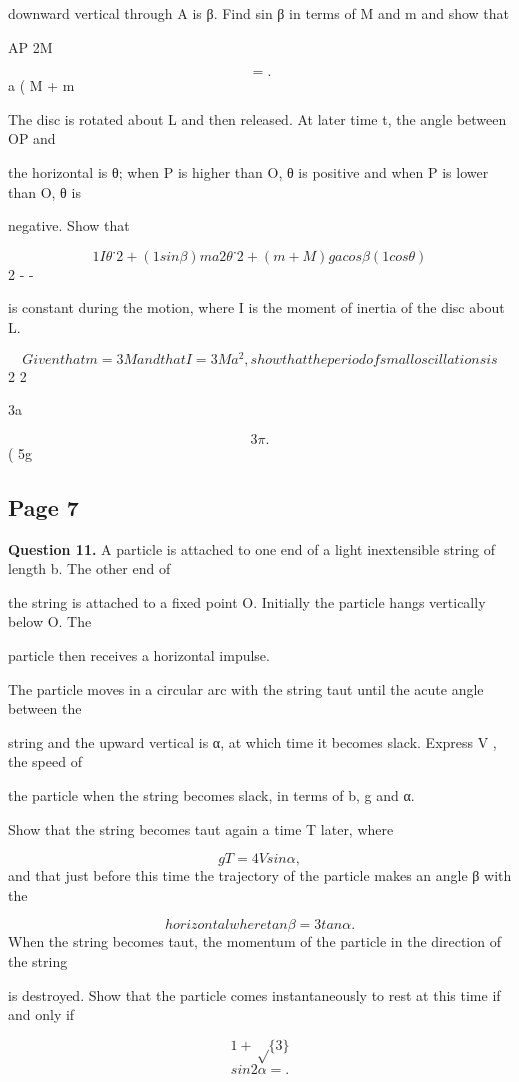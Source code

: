 \documentclass[12pt]{article}
\begin{document}
\begin{flushleft}
downward vertical through A is β. Find sin β in terms of M and m and show that\par
AP 2M\par
\[= .\]
a ( M + m\par
The disc is rotated about L and then released. At later time t, the angle between OP and\par
the horizontal is θ; when P is higher than O, θ is positive and when P is lower than O, θ is\par
negative. Show that\par
\[1 Iθ˙2 + (1 sin β)ma2θ˙2 + (m + M )ga cos β (1 cos θ)\]
2 - -\par
is constant during the motion, where I is the moment of inertia of the disc about L.\par
\[Given that m = 3 M and that I = 3 M a^2, show that the period of small oscillations is\]
2 2\par
3a\par
\[3\pi .\]
( 5g\par
\end{flushleft}
\subsection*{Page 7}
\begin{flushleft}
\bigskip\textbf{Question 11.} A particle is attached to one end of a light inextensible string of length b. The other end of\par
the string is attached to a fixed point O. Initially the particle hangs vertically below O. The\par
particle then receives a horizontal impulse.\par
The particle moves in a circular arc with the string taut until the acute angle between the\par
string and the upward vertical is α, at which time it becomes slack. Express V , the speed of\par
the particle when the string becomes slack, in terms of b, g and α.\par
Show that the string becomes taut again a time T later, where\par
\[gT = 4V sin α ,\]
and that just before this time the trajectory of the particle makes an angle β with the\par
\[horizontal where tan β = 3 tan α .\]
When the string becomes taut, the momentum of the particle in the direction of the string\par
is destroyed. Show that the particle comes instantaneously to rest at this time if and only if\par
\[1 + \sqrt\{3\}\]
\[sin2 α = .\]
\end{flushleft}
\end{document}

